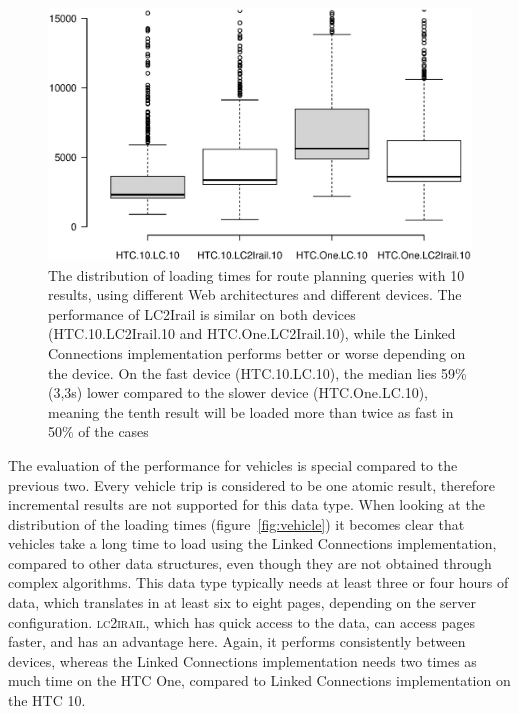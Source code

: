 \documentclass[twocolumn]{phdsymp} %
\begin{document}
\begin{figure}[ht]
	\begin{center}
		\includegraphics[trim=3cm 4cm 0 0, width=.50\textwidth]{images/boxplot_routes_10.eps}
		\caption{\label{fig:routebox} The distribution of loading times for route planning queries with 10 results, using different Web architectures and different devices. The performance of LC2Irail is similar on both devices (HTC.10.LC2Irail.10 and HTC.One.LC2Irail.10), while the Linked Connections implementation performs better or worse depending on the device. On the fast device (HTC.10.LC.10), the median lies 59\% (3,3s) lower compared to the slower device (HTC.One.LC.10), meaning the tenth result will be loaded more than twice as fast in 50\% of the cases }
	\end{center}
\end{figure}

The evaluation of the performance for vehicles is special compared to the previous two. Every vehicle trip is considered to be one atomic result, therefore incremental results are not supported for this data type. When looking at the distribution of the loading times (figure~\ref{fig:vehicle}) it becomes clear that vehicles take a long time to load using the Linked Connections implementation, compared to other data structures, even though they are not obtained through complex algorithms. This data type typically needs at least three or four hours of data, which translates in at least six to eight pages, depending on the server configuration. \textsc{lc2irail}, which has quick access to the data, can access pages faster, and has an advantage here. Again, it performs consistently between devices, whereas the Linked Connections implementation needs two times as much time on the HTC One, compared to Linked Connections implementation on the HTC 10.
\end{document}
